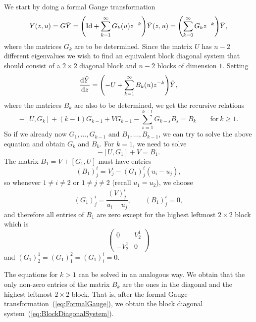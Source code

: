 \documentclass[pdftex]{sigma}
\numberwithin{equation}{section}
\begin{document}
 We start by doing a formal Gauge transformation
 \begin{equation}
 \label{eq:FormalGauge}
 Y(z,u)=G\tilde{Y}=\Biggl({\rm Id}+\sum_{k=1}^{\infty}G_{k}(u)z^{-k}\Biggr)\tilde{Y}(z,u)=\Biggl(\sum_{k=0}^{\infty}G_{k}z^{-k}\Biggr)\tilde{Y},
 \end{equation}
 where the matrices $G_{k}$ are to be determined. Since the matrix $U$ has $n-2$ different eigenvalues we wish to find an equivalent block diagonal system that should consist of a $2\times 2$ diagonal block and $n-2$ blocks of dimension $1$. Setting
 \begin{equation}
 \label{eq:BlockDiagonalSystem}
 \frac{{\rm d}\tilde{Y}}{{\rm d}z}=\Biggl(-U+\sum_{k=1}^{\infty}B_{k}(u)z^{-k}\Biggr)\tilde{Y},
 \end{equation}
 where the matrices $B_{k}$ are also to be determined, we get the recursive relations
 \begin{equation}
 \label{eq:GRecursiveRelations}
 -[U,G_{k}]+(k-1)G_{k-1}+VG_{k-1}-\sum_{s=1}^{k-1}G_{k-s}B_{s}=B_{k} \qquad\mathrm{for}\ k\geq 1.
 \end{equation}
 So if we already now $G_{1},\dots,G_{k-1}$ and $B_{1},\dots,B_{k-1}$, we can try to solve the above equation and obtain $G_{k}$ and $B_{k}$. For $k=1$, we need to solve
 \begin{equation*}
 -[U,G_{1}]+V=B_{1}.
 \end{equation*}
 The matrix $B_{1}=V+[G_{1},U]$ must have entries
 \begin{equation*}
 (B_{1})^{i}_{j}=V^{i}_{j}-(G_{1})^{i}_{j}(u_{i}-u_{j}),
 \end{equation*}
 so whenever $1\neq i\neq 2$ or $1\neq j\neq 2$ (recall $u_{1}=u_{2}$), we choose
 \begin{equation}
 \label{eq:G1Equation}
 (G_{1})^{i}_{j}=\frac{(V)^{i}_{j}}{u_{i}-u_{j}},\qquad
 (B_{1})^{i}_{j}=0,
 \end{equation}
 and therefore all entries of $B_{1}$ are zero except for the highest leftmost $2\times 2$ block which is
 \begin{equation*}
 \begin{pmatrix}
 0 & V^{1}_{2}\\
 -V^{1}_{2}& 0
 \end{pmatrix}
 \end{equation*}
 and $(G_{1})^{1}_{2}=(G_{1})^{2}_{1}=(G_{1})^{i}_{i}=0$.

 The equations for $k>1$ can be solved in an analogous way. We obtain that the only non-zero entries of the matrix $B_{k}$ are the ones in the diagonal and the highest leftmost $2\times 2$ block. That is, after the formal Gauge transformation~(\ref{eq:FormalGauge}), we obtain the block diagonal system~(\ref{eq:BlockDiagonalSystem}).
\end{document}
